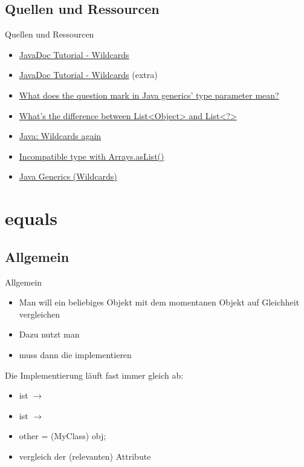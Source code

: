 \documentclass[usepdftitle=false,hyperref={pdfpagelabels=false}]{beamer}
\begin{document}
\subsection{Quellen und Ressourcen}
\begin{frame}{Quellen und Ressourcen}
    \begin{itemize}
        \item \href{http://docs.oracle.com/javase/tutorial/java/generics/wildcards.html}{JavaDoc Tutorial - Wildcards} 
        \item \href{http://docs.oracle.com/javase/tutorial/extra/generics/wildcards.html}{JavaDoc Tutorial - Wildcards} (extra)
        \item \href{http://stackoverflow.com/q/3009745/562769}{What does the question mark in Java generics' type parameter mean?}
        \item \href{http://stackoverflow.com/q/12340808/562769}{What's the difference between List<Object> and List<?>}
        \item \href{http://stackoverflow.com/q/12348777/562769}{Java: Wildcards again}
        \item \href{http://stackoverflow.com/q/14091771/562769}{Incompatible type with Arrays.asList()}
        \item \href{http://stackoverflow.com/q/252055/562769}{Java Generics (Wildcards)}
    \end{itemize}
\end{frame}

\section{equals}
\subsection{Allgemein}
\begin{frame}{Allgemein}
    \begin{itemize}[<+->]
        \item Man will ein beliebiges Objekt mit dem momentanen 
              Objekt auf Gleichheit vergleichen
        \item Dazu nutzt man 
        \item {} muss dann die  implementieren
    \end{itemize}

    Die Implementierung läuft fast immer gleich ab:
    \begin{itemize}[<+->]
        \item ist  $\rightarrow$ 
        \item ist  $\rightarrow$ 
        \item other = (MyClass) obj;
        \item vergleich der (relevanten) Attribute
    \end{itemize}
\end{frame}
\end{document}
